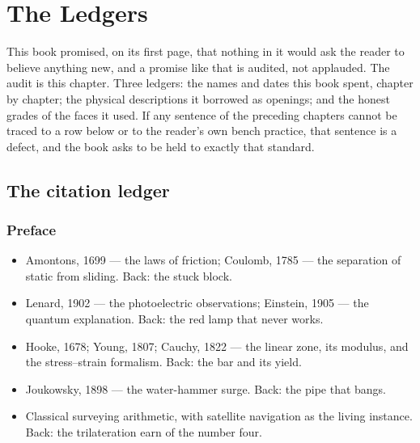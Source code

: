 \chapter{The Ledgers}

This book promised, on its first page, that nothing in it would ask the
reader to believe anything new, and a promise like that is audited, not
applauded. The audit is this chapter. Three ledgers: the names and dates
this book spent, chapter by chapter; the physical descriptions it borrowed
as openings; and the honest grades of the faces it used. If any sentence
of the preceding chapters cannot be traced to a row below or to the
reader's own bench practice, that sentence is a defect, and the book asks
to be held to exactly that standard.

\section*{The citation ledger}

\subsection*{Preface}
\begin{itemize}
\item Amontons, 1699 --- the laws of friction; Coulomb, 1785 --- the
separation of static from sliding. Back: the stuck block.
\item Lenard, 1902 --- the photoelectric observations; Einstein, 1905 ---
the quantum explanation. Back: the red lamp that never works.
\item Hooke, 1678; Young, 1807; Cauchy, 1822 --- the linear zone, its
modulus, and the stress--strain formalism. Back: the bar and its yield.
\item Joukowsky, 1898 --- the water-hammer surge. Back: the pipe that
bangs.
\item Classical surveying arithmetic, with satellite navigation as the
living instance. Back: the trilateration earn of the number four.
\end{itemize}

